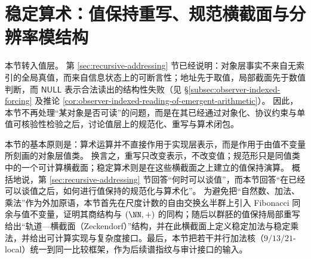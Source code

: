 \section{稳定算术：值保持重写、规范横截面与分辨率模结构}\label{sec:emergent-arithmetic}



本节转入值层。
第 \ref{sec:recursive-addressing} 节已经说明：对象层事实不来自无索引的全局真值，而来自信息状态上的可断言性；地址先于取值，局部截面先于数值判断，而 \(\mathsf{NULL}\) 表示合法读出的结构性失败（见 \S\ref{subsec:observer-indexed-forcing} 及推论 \ref{cor:observer-indexed-reading-of-emergent-arithmetic}）。
因此，本节不再处理“某对象是否可读”的问题，而是在其已经通过对象化、协议约束与单值可核验性检验之后，讨论值层上的规范化、重写与算术闭包。

本节的基本原则是：算术运算并不直接作用于实现层表示，而是作用于由值不变量所刻画的对象层值类。
换言之，重写只改变表示，不改变值；规范形只是同值类中的一个可计算横截面；稳定算术则是在这些横截面之上建立的值保持演算。
概括地说，第 \ref{sec:recursive-addressing} 节回答“何时可以谈值”，而本节回答“在已经可以谈值之后，如何进行值保持的规范化与算术化”。
为避免把“自然数、加法、乘法”作为外加原语，本节首先在尺度计数的自由交换幺半群上引入 Fibonacci 同余与值不变量，证明其商结构与 \((\NN,+)\) 的同构；随后以群胚的值保持局部重写给出“轨道—横截面（Zeckendorf）”结构，并在此横截面上定义稳定加法与稳定乘法，并给出可计算实现与复杂度接口。最后，本节把若干并行加法核（\(9/13/21\)-local）统一到同一比较框架，作为后续谱指纹与审计接口的输入。



















